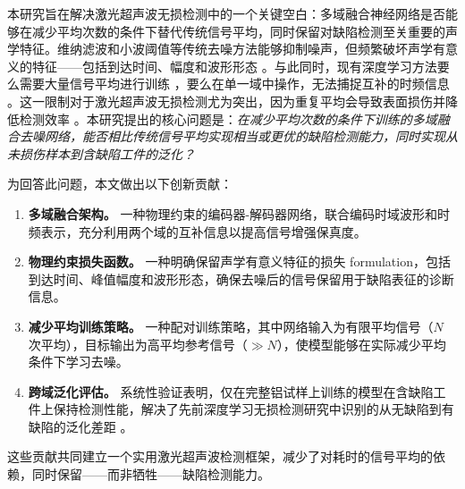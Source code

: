 本研究旨在解决激光超声波无损检测中的一个关键空白：多域融合神经网络是否能够在减少平均次数的条件下替代传统信号平均，同时保留对缺陷检测至关重要的声学特征。维纳滤波和小波阈值等传统去噪方法能够抑制噪声，但频繁破坏声学有意义的特征——包括到达时间、幅度和波形形态 \cite{chen2019wavelet}。与此同时，现有深度学习方法要么需要大量信号平均进行训练 \cite{liu2022deep}，要么在单一域中操作，无法捕捉互补的时频信息 \cite{zhang2020deep}。这一限制对于激光超声波无损检测尤为突出，因为重复平均会导致表面损伤并降低检测效率 \cite{yang2023unsupervised}。本研究提出的核心问题是：\emph{在减少平均次数的条件下训练的多域融合去噪网络，能否相比传统信号平均实现相当或更优的缺陷检测能力，同时实现从未损伤样本到含缺陷工件的泛化？}

为回答此问题，本文做出以下创新贡献：

\begin{enumerate}
\item \textbf{多域融合架构。} 一种物理约束的编码器-解码器网络，联合编码时域波形和时频表示，充分利用两个域的互补信息以提高信号增强保真度。

\item \textbf{物理约束损失函数。} 一种明确保留声学有意义特征的损失 formulation，包括到达时间、峰值幅度和波形形态，确保去噪后的信号保留用于缺陷表征的诊断信息。

\item \textbf{减少平均训练策略。} 一种配对训练策略，其中网络输入为有限平均信号（$N$ 次平均），目标输出为高平均参考信号（$\gg N$），使模型能够在实际减少平均条件下学习去噪。

\item \textbf{跨域泛化评估。} 系统性验证表明，仅在完整铝试样上训练的模型在含缺陷工件上保持检测性能，解决了先前深度学习无损检测研究中识别的从无缺陷到有缺陷的泛化差距 \cite{liu2022deep}。
\end{enumerate}

这些贡献共同建立一个实用激光超声波检测框架，减少了对耗时的信号平均的依赖，同时保留——而非牺牲——缺陷检测能力。